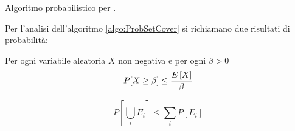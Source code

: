 \begin{algorithm}
	\caption{Algoritmo probabilistico per \MinSetCover.}
	\label{algo:ProbSetCover}
	
\end{algorithm}

Per l'analisi dell'algoritmo \ref{algo:ProbSetCover} si richiamano due risultati di probabilità:
\begin{theorem}\label{thm:markov}
	Per ogni variabile aleatoria $X$ non negativa e per ogni $\beta>0$
	\begin{equation*}
		P[X\geq\beta] \leq \frac{E\left[X\right]}{\beta}
	\end{equation*}
\end{theorem}
\begin{theorem}\label{thm:boole}
	\begin{equation*}
		P\left[\bigcup_i E_i\right] \leq \sum_i P[E_i]
	\end{equation*}
\end{theorem}

